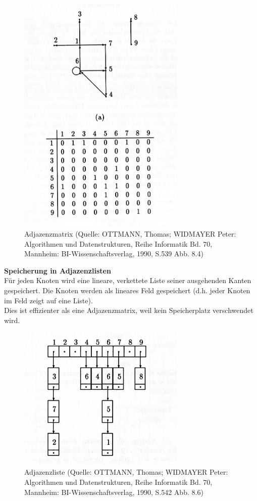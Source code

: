 \documentclass[a4paper,12pt]{article}
\begin{document}
\begin{figure}[h]
\centering
\includegraphics[width = 8cm]{adjazenzmatrix.jpg}
\caption{Adjazenzmatrix {\tiny (Quelle: OTTMANN, Thomas; WIDMAYER Peter: Algorithmen und Datenstrukturen, Reihe Informatik Bd. 70, Mannheim: BI-Wissenschaftsverlag, 1990, S.539 Abb. 8.4)} }
\label{a2}
\end{figure}
 
\textbf{Speicherung in Adjazenzlisten}\\
Für jeden Knoten wird eine lineare, verkettete Liste seiner ausgehenden Kanten gespeichert.
Die Knoten werden als lineares Feld gespeichert (d.h. jeder Knoten im Feld zeigt auf eine Liste). \\
Dies ist effizienter als eine Adjazenzmatrix, weil kein Speicherplatz verschwendet wird. \\

\begin{figure}[h]
\centering
\includegraphics[width = 8cm]{adjazenzliste.jpg}
\caption{Adjazenzliste {\tiny (Quelle: OTTMANN, Thomas; WIDMAYER Peter: Algorithmen und Datenstrukturen, Reihe Informatik Bd. 70, Mannheim: BI-Wissenschaftsverlag, 1990, S.542 Abb. 8.6)} }
\label{a3}
\end{figure} 
\end{document}
